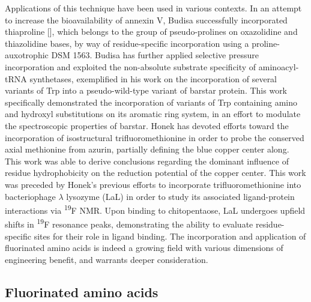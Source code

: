 \begin{refsection}
Applications of this technique have been used in various contexts. In an attempt
to increase the bioavailability of annexin V, Budisa successfully incorporated
thiaproline [], which belongs to the
group of pseudo-prolines on oxazolidine and thiazolidine bases, by way of
residue-specific incorporation using a proline-auxotrophic  DSM
1563.\cite{Budisa1998} Budisa has further applied selective pressure
incorporation and exploited the non-absolute substrate specificity of
aminoacyl-tRNA synthetases, exemplified in his work on the incorporation of
several variants of Trp into a pseudo-wild-type variant of barstar
protein.\cite{Budisa2002} This work specifically demonstrated the incorporation
of variants of Trp containing amino and hydroxyl substitutions on its aromatic
ring system, in an effort to modulate the spectroscopic properties of barstar.
Honek has devoted efforts toward the incorporation of isostructural trifluoromethionine in
order to probe the conserved axial methionine from  azurin, partially defining the blue copper center
along.\cite{Garner2006} This work was able to derive conclusions regarding the
dominant influence of residue hydrophobicity on the reduction potential of the
copper center. This work was preceded by Honek's previous efforts to incorporate
trifluoromethionine into bacteriophage ${\lambda}$ lysozyme (LaL) in order to
study its associated ligand-protein interactions via \textsuperscript{19}F
NMR.\cite{Duewel1997} Upon binding to chitopentaose, LaL undergoes upfield
shifts in \textsuperscript{19}F resonance peaks, demonstrating the ability to
evaluate residue-specific sites for their role in ligand binding. The
incorporation and application of fluorinated amino acids is indeed a growing
field with various dimensions of engineering benefit, and warrants deeper
consideration.

\subsection{Fluorinated amino acids}
\label{sec:fluorinated_amino_acids}


\end{refsection}
